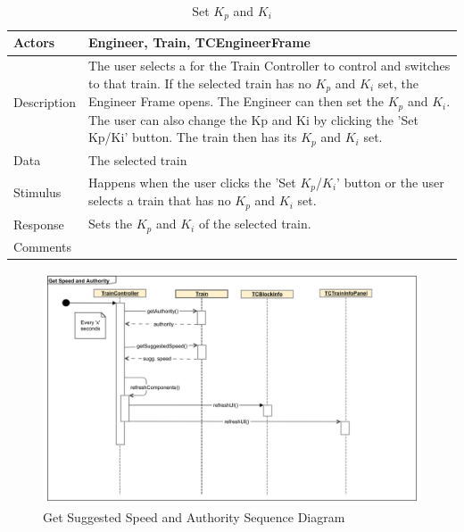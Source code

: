 \documentclass[]{article}
\begin{document}
\begin{table}[H]
	\centering
	\caption{Set $K_p$ and $K_i$}
	\begin{tabular}{|l|l|}
		\hline
		Actors & \parbox[t]{10cm}{Engineer, Train, TCEngineerFrame} \\ \hline
		Description & \parbox[t]{10cm}{The user selects a for the Train Controller to control and switches to that train. If the selected train has no $K_p$ and $K_i$ set, the Engineer Frame opens. The Engineer can then set the $K_p$ and $K_i$. The user can also change the Kp and Ki by clicking the 'Set Kp/Ki' button. The train then has its $K_p$ and $K_i$ set.} \\ \hline
		Data &  \parbox[t]{10cm}{The selected train} \\ \hline
		Stimulus &  \parbox[t]{10cm}{ Happens when the user clicks the 'Set $K_p$/$K_i$' button or the user selects a train that has no $K_p$ and $K_i$ set. } \\ \hline
		Response & \parbox[t]{10cm}{Sets the $K_p$ and $K_i$ of the selected train.  }\\ \hline
		Comments & \parbox[t]{10cm}{}  \\ \hline
	\end{tabular}
\end{table}

\begin{figure}[H]
	\centering
	\includegraphics[width=\textwidth]{tc_speedAndAuth_usecase}
	\caption{Get Suggested Speed and Authority Sequence Diagram}
\end{figure}
\end{document}
